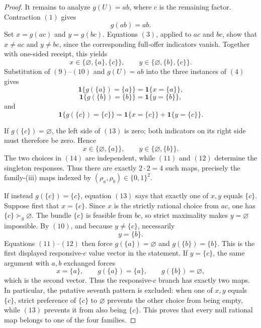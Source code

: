 \documentclass{article}
\begin{document}
\begin{proof}
It remains to analyze \(g(U)=ab\), where \(c\) is the remaining
factor.  Contraction \((1)\) gives
\[
g(ab)=ab. \tag{9}
\]
Set \(x=g(ac)\) and \(y=g(bc)\).  Equations \((3)\), applied to
\(ac\) and \(bc\), show that \(x\ne ac\) and \(y\ne bc\), since the
corresponding full-offer indicators vanish.  Together with one-sided
receipt, this yields
\[
x\in\{\varnothing,\{a\},\{c\}\},
\qquad
y\in\{\varnothing,\{b\},\{c\}\}. \tag{10}
\]
Substitution of \((9)\)--\((10)\) and \(g(U)=ab\) into the three
instances of \((4)\) gives
\[
\mathbf 1\{g(\{a\})=\{a\}\}
=\mathbf 1\{x=\{a\}\}, \tag{11}
\]
\[
\mathbf 1\{g(\{b\})=\{b\}\}
=\mathbf 1\{y=\{b\}\}, \tag{12}
\]
and
\[
\mathbf 1\{g(\{c\})=\{c\}\}
=\mathbf 1\{x=\{c\}\}+\mathbf 1\{y=\{c\}\}. \tag{13}
\]

If \(g(\{c\})=\varnothing\), the left side of \((13)\) is zero;
both indicators on its right side must therefore be zero.  Hence
\[
x\in\{\varnothing,\{a\}\},
\qquad
y\in\{\varnothing,\{b\}\}. \tag{14}
\]
The two choices in \((14)\) are independent, while \((11)\) and
\((12)\) determine the singleton responses.  Thus there are exactly
\(2\cdot2=4\) such maps, precisely the family-(iii) maps indexed by
\((\rho_a,\rho_b)\in\{0,1\}^2\).

If instead \(g(\{c\})=\{c\}\), equation \((13)\) says that exactly
one of \(x,y\) equals \(\{c\}\).  Suppose first that
\(x=\{c\}\).  Since \(x\) is the strictly rational choice from
\(ac\), one has \(\{c\}\succ_g\varnothing\).  The bundle
\(\{c\}\) is feasible from \(bc\), so strict maximality makes
\(y=\varnothing\) impossible.  By \((10)\), and because
\(y\ne\{c\}\), necessarily
\[
y=\{b\}. \tag{15}
\]
Equations \((11)\)--\((12)\) then force
\(g(\{a\})=\varnothing\) and \(g(\{b\})=\{b\}\).  This is the
first displayed responsive-\(c\) value vector in the statement.  If
\(y=\{c\}\), the same argument with \(a,b\) exchanged forces
\[
x=\{a\},
\qquad
g(\{a\})=\{a\},
\qquad
g(\{b\})=\varnothing, \tag{16}
\]
which is the second vector.  Thus the responsive-\(c\) branch has
exactly two maps.  In particular, the putative seventh pattern is
excluded: when one of \(x,y\) equals \(\{c\}\), strict preference of
\(\{c\}\) to \(\varnothing\) prevents the other choice from being
empty, while \((13)\) prevents it from also being \(\{c\}\).
This proves that every null rational map belongs to one of the four
families.


\end{proof}
\end{document}
